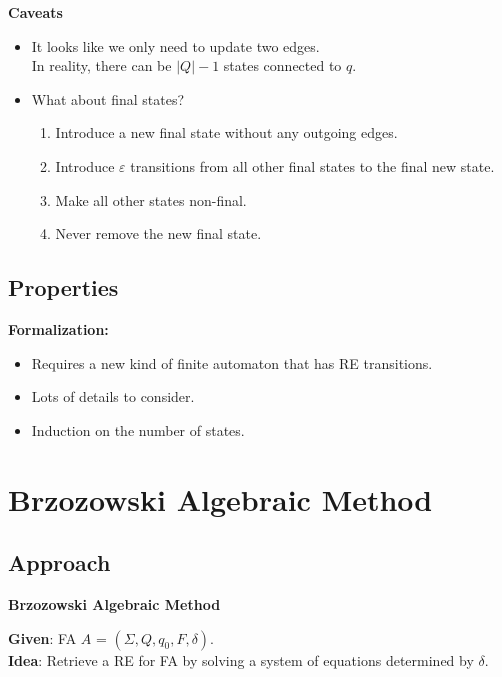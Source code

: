 \documentclass{beamer}
\begin{document}
\begin{frame}
    \textbf{Caveats} \\
    \begin{itemize}
        \item
            It looks like we only need to update two edges. \\
            In reality, there can be $|Q|-1$ states connected to $q$.
        \item
            What about final states?\\
            \pause
            \begin{enumerate}
                \item
                    Introduce a new final state without any outgoing edges.
                \item
                    Introduce $\varepsilon$ transitions from all other final states to the final new state.
                \item
                    Make all other states non-final.
                \item
                    Never remove the new final state.
            \end{enumerate}
    \end{itemize}
\end{frame}

\subsection*{Properties}
\begin{frame}
    \textbf{Formalization:} \\
    \begin{itemize}
        \item
            Requires a new kind of finite automaton that has RE transitions.
        \item
            Lots of details to consider.
        \item
            Induction on the number of states.
    \end{itemize}
\end{frame}

\section{Brzozowski Algebraic Method}
\subsection*{Approach}
\begin{frame}
    \textbf{Brzozowski Algebraic Method}

    \textbf{Given}: FA $A$ = $(\Sigma, Q, q_0, F, \delta)$.\\
    \textbf{Idea}: Retrieve a RE for FA by solving a system of equations determined by $\delta$.

\end{frame}
\end{document}
